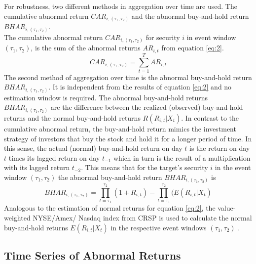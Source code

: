 \documentclass[12pt]{article}
\begin{document}
For robustness, two different methods in aggregation over time are used. The cumulative abnormal return $CAR_{i,(\tau_1,\tau_2)}$ and the abnormal buy-and-hold return $BHAR_{i,(\tau_1,\tau_2)}$.\\
The cumulative abnormal return $CAR_{i,(\tau_1,\tau_2)}$ for security $i$ in event window $(\tau_1,\tau_2)$, is the sum of the abnormal returns $AR_{i,t}$ from equation \eqref{eq:2}.
	\begin{equation}
		CAR_{i,(\tau_1,\tau_2)}=\sum_{t=1}^{T}AR_{i,t}
	\end{equation}
The second method of aggregation over time is the abnormal buy-and-hold return $BHAR_{i,(\tau_1,\tau_2)}$. It is independent from the results of equation \eqref{eq:2} and no estimation window is required. 
The abnormal buy-and-hold returns $BHAR_{i,(\tau_1,\tau_2)}$ are the difference between the realized (observed) buy-and-hold returns and the normal buy-and-hold returns $R(R_{i,t}|X_{t})$.
In contrast to the cumulative abnormal return, the buy-and-hold return mimics the investment strategy of investors that buy the stock and hold it for a longer period of time. In this sense, the actual (normal) buy-and-hold return on day $t$ is the return on day $t$ times its lagged return on day $t_{-1}$ which in turn is the result of a multiplication with its lagged return $t_{-2}$. This means that for the target's security $i$ in the event window $(\tau_1,\tau_2)$ the abnormal buy-and-hold return $BHAR_{i,(\tau_1,\tau_2)}$ is
\begin{equation}
	BHAR_{i,(\tau_1,\tau_2)}=\prod_{t=\tau_1}^{\tau_2}(1+R_{i,t})-\prod_{t=\tau_1}^{\tau_2}(E(R_{i,t}|X_{t})
\end{equation}
Analogous to the estimation of normal returns for equation \eqref{eq:2}, the value-weighted NYSE/Amex/ Nasdaq index from CRSP is used to calculate the normal buy-and-hold returns $E(R_{i,t}|X_{t})$ in the respective event windows $(\tau_1,\tau_2)$ \citep[p.25]{Brav2009}.

\subsection{Time Series of Abnormal Returns}
\end{document}
